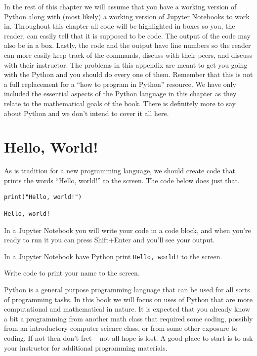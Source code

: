 In the rest of this chapter we will assume that you have a working version of Python along
with (most likely) a working version of Jupyter Notebooks to work in.  Throughout this
chapter all code will be highlighted in boxes so you, the reader, can easily tell that it
is supposed to be code.  The output of the code may also be in a box.  Lastly, the code
and the output have line numbers so the reader can more easily keep track of the commands,
discuss with their peers, and discuss with their instructor.  The problems in this
appendix are
meant to get you going with the Python and you should do every one of them.  Remember that
this is not a full replacement for a ``how to program in Python'' resource.  We have only
included the essential aspects of the Python language in this chapter as they relate to
the mathematical goals of the book.  There is definitely more to say about Python and we
don't intend to cover it all here.


\section{Hello, World!}

As is tradition for a new programming language, we should create code that prints the
words ``Hello, world!'' to the screen.  The code below does just that.  

\bcode
\begin{lstlisting}
print("Hello, world!")
\end{lstlisting}
\boutput
\begin{lstlisting}
Hello, world!
\end{lstlisting}

In a Jupyter Notebook you will write your code in a code block, and when you're ready to
run it you can press Shift+Enter and you'll see your output.
\begin{problem}
    In a Jupyter Notebook have Python print \texttt{Hello, world!} to the screen.
\end{problem}

\begin{problem}
    Write code to print your name to the screen.
\end{problem}

Python is a general purpose programming language that can be used for all sorts of
programming tasks.  In this book we will focus on uses of Python that are more
computational and mathematical in nature.  It is expected that you already know a bit a
programming from another math class that required some coding, possibly from an
introductory computer science class, or from some other exposure to coding.  If not then
don't fret -- not all hope is lost.  A good place to start is to ask your instructor for
additional programming materials.  

